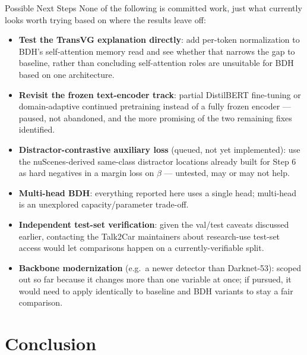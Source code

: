 \documentclass[aspectratio=169]{beamer}
\begin{document}
\begin{frame}{Possible Next Steps}
  \scriptsize None of the following is committed work, just what
  currently looks worth trying based on where the results leave off:
  \begin{itemize}\setlength{\itemsep}{2pt}
    \item \textbf{Test the TransVG explanation directly}: add per-token
      normalization to BDH's self-attention memory read and see whether
      that narrows the gap to baseline, rather than concluding
      self-attention roles are unsuitable for BDH based on one
      architecture.
    \item \textbf{Revisit the frozen text-encoder track}: partial
      DistilBERT fine-tuning or domain-adaptive continued pretraining
      instead of a fully frozen encoder — paused, not abandoned, and
      the more promising of the two remaining fixes identified.
    \item \textbf{Distractor-contrastive auxiliary loss} (queued, not
      yet implemented): use the nuScenes-derived same-class distractor
      locations already built for Step 6 as hard negatives in a margin
      loss on $\beta$ — untested, may or may not help.
    \item \textbf{Multi-head BDH}: everything reported here uses a
      single head; multi-head is an unexplored capacity/parameter
      trade-off.
    \item \textbf{Independent test-set verification}: given the
      val/test caveats discussed earlier, contacting the Talk2Car
      maintainers about research-use test-set access would let
      comparisons happen on a currently-verifiable split.
    \item \textbf{Backbone modernization} (e.g.\ a newer detector than
      Darknet-53): scoped out so far because it changes more than one
      variable at once; if pursued, it would need to apply identically
      to baseline and BDH variants to stay a fair comparison.
  \end{itemize}
\end{frame}

\section{Conclusion}
\end{document}
